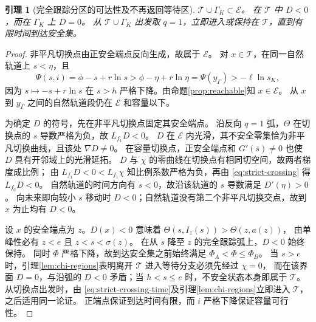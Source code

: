 \documentclass[11pt,a4paper,UTF8]{ctexart}
\newtheorem{lemma}[theorem]{引理}
\theoremstyle{definition}
\begin{document}
\begin{lemma}[完全跟踪分区的可达性及不再返回等待区]
\label{lem:tracking-region}
$\mathcal T\cup\Gamma_K\subset\mathcal E$。
在 $\mathcal T$ 中 $D<0$，而在 $\Gamma_K$ 上 $D=0$。
从 $\mathcal T\cup\Gamma_K$ 出发取 $q=1$，立即进入或保持在 $\mathcal T$，直到有限时间到达安全集。
\end{lemma}
\begin{proof}
非平凡切换点由正安全端点反向生成，故属于 $\mathcal E$。
对 $x\in\mathcal T$，在同一自然轨道上 $s<\eta$，且
\[
\Psi(s,i)=\phi-s+r\ln s>\phi-\eta+r\ln\eta=\Psi(y_\Gamma)>-\ell\ln s_K,
\]
因为 $s\mapsto-s+r\ln s$ 在 $s>h$ 严格下降。由命题\ref{prop:reachable}知 $x\in\mathcal E$。
从 $x$ 到 $y_\Gamma$ 之间的自然轨道段仍在 $\mathcal E$ 和容量以下。

为确定 $D$ 的符号，先在非平凡切换点固定其安全端点。
沿反向 $q=1$ 弧，$\Theta$ 在切换点的 $s$ 导数严格为负，故 $L_{f_1}D<0$。
$D$ 在 $\mathcal E$ 内光滑，其不安全零集恰为非平凡切换曲线，且该处 $\nabla D\ne0$。
在容量切换点，正安全端点和 $G'(\bar s)\ne0$ 也使 $D$ 具有开邻域上的光滑延拓。
$D$ 与 $\chi$ 的零曲线在切换点有相同切空间，故两者梯度成比例；
由 $L_{f_1}D<0<L_{f_1}\chi$ 知比例系数严格为负，再由 \eqref{eq:strict-crossing} 得 $L_{f_0}D<0$。
自然轨道的时间方向有 $\dot s<0$，故沿该轨道的 $s$ 导数满足 $D'(\eta)>0$。
向未来即向较小 $s$ 移动时 $D<0$；自然轨道没有第二个非平凡切换交点，故到 $x$ 为止均有 $D<0$。

设 $x$ 的安全端点为 $z$。$D(x)<0$ 意味着 $\Theta(s,I_z(s))>\Theta(z,a(z))$，
由单峰性必有 $z<e$ 且 $z<s<\sigma(z)$。
在从 $s$ 降至 $z$ 的完全跟踪弧上，$D<0$ 始终保持。
同时 $\Phi$ 严格下降，故到达安全集之前始终满足 $\Phi_A<\Phi\le\Phi_B$。
当 $s>e$ 时，引理\ref{lem:chi-regions}表明离开 $\mathcal T$ 进入等待分支必须先经过 $\chi=0$，
而在该界面 $D=0$，与沿弧的 $D<0$ 矛盾；当 $h<s\le e$ 时，不安全状态本身即属于 $\mathcal T$。
从切换点出发时，由 \eqref{eq:strict-crossing-time}及引理\ref{lem:chi-regions}立即进入 $\mathcal T$，
之后适用同一论证。
正端点保证到达时间有限，而 $i$ 严格下降保证容量可行性。
\end{proof}
\end{document}
